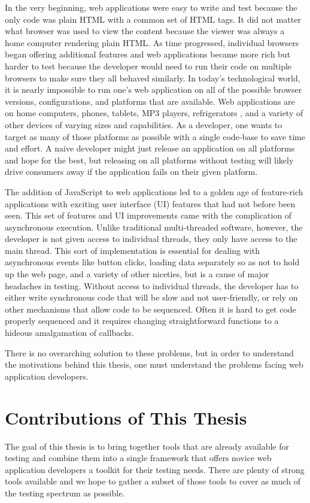 \documentclass[12pt]{ucthesis}
\begin{document}
In the very beginning, web applications were easy to write and test because the only code was plain HTML with a common set of HTML tags. It did not matter what browser was used to view the content because the viewer was always a home computer rendering plain HTML. As time progressed, individual browsers began offering additional features and web applications became more rich but harder to test because the developer would need to run their code on multiple browsers to make sure they all behaved similarly. In today's technological world, it is nearly impossible to run one's web application on all of the possible browser versions, configurations, and platforms that are available. Web applications are on home computers, phones, tablets, MP3 players, refrigerators \cite{SamsungFridge}, and a variety of other devices of varying sizes and capabilities. As a developer, one wants to target as many of those platforms as possible with a single code-base to save time and effort. A naive developer might just release an application on all platforms and hope for the best, but releasing on all platforms without testing will likely drive consumers away if the application fails on their given platform.

The addition of JavaScript to web applications led to a golden age of feature-rich applications with exciting user interface (UI) features that had not before been seen. This set of features and UI improvements came with the complication of asynchronous execution. Unlike traditional multi-threaded software, however, the developer is not given access to individual threads, they only have access to the main thread. This sort of implementation is essential for dealing with asynchronous events like button clicks, loading data separately so as not to hold up the web page, and a variety of other niceties, but is a cause of major headaches in testing. Without access to individual threads, the developer has to either write synchronous code that will be slow and not user-friendly, or rely on other mechanisms that allow code to be sequenced. Often it is hard to get code properly sequenced and it requires changing straightforward functions to a hideous amalgamation of callbacks.

There is no overarching solution to these problems, but in order to understand the motivations behind this thesis, one must understand the problems facing web application developers.

\section{Contributions of This Thesis}
The goal of this thesis is to bring together tools that are already available for testing and combine them into a single framework that offers novice web application developers a toolkit for their testing needs. There are plenty of strong tools available and we hope to gather a subset of those tools to cover as much of the testing spectrum as possible. 
\end{document}
